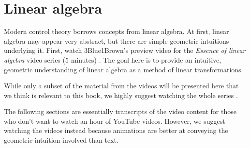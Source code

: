 
\chapter{Linear algebra}

Modern control theory borrows concepts from linear algebra. At first, linear
algebra may appear very abstract, but there are simple geometric intuitions
underlying it. First, watch 3Blue1Brown's preview video for the
\textit{Essence of linear algebra} video series (5 minutes)
\cite{bib:linalg_preview}. The goal here is to provide an intuitive, geometric
understanding of linear algebra as a method of linear transformations.

While only a subset of the material from the videos will be presented here that
we think is relevant to this book, we highly suggest watching the whole series
\cite{bib:essence_of_linalg}.

\begin{remark}
  The following sections are essentially transcripts of the video content for
  those who don't want to watch an hour of YouTube videos. However, we suggest
  watching the videos instead because animations are better at conveying the
  geometric intuition involved than text.
\end{remark}











